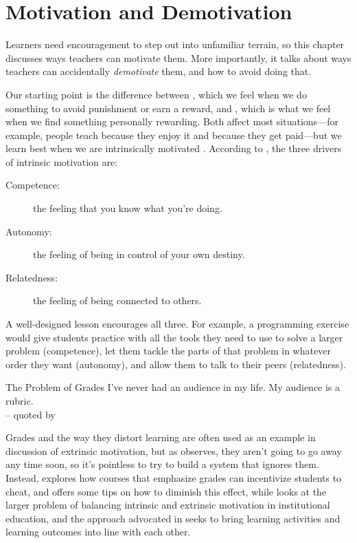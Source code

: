 \chapter{Motivation and Demotivation}\label{s:motivation}

Learners need encouragement to step out into unfamiliar terrain, so this
chapter discusses ways teachers can motivate them. More importantly, it
talks about ways teachers can accidentally \emph{demotivate} them, and how to
avoid doing that.

Our starting point is the difference between , which we feel when we do
something to avoid punishment or earn a reward, and , which is what we feel when we
find something personally rewarding. Both affect most situations---for
example, people teach because they enjoy it and because they get
paid---but we learn best when we are intrinsically motivated
\cite{Wlod2017}. According to , the three drivers of intrinsic
motivation are:

\begin{description}
\item[Competence:]
the feeling that you know what you're doing.
\item[Autonomy:]
the feeling of being in control of your own destiny.
\item[Relatedness:]
the feeling of being connected to others.
\end{description}

A well-designed lesson encourages all three. For example, a programming
exercise would give students practice with all the tools they need to
use to solve a larger problem (competence), let them tackle the parts of
that problem in whatever order they want (autonomy), and allow them to
talk to their peers (relatedness).

\begin{aside}{The Problem of Grades}
  I've never had an audience in my life. My audience is a rubric.\\
  -- quoted by 

  Grades and the way they distort learning are often used as an
  example in discussion of extrinsic motivation, but as
  \cite{Mill2016a} observes, they aren't going to go away any time
  soon, so it's pointless to try to build a system that ignores
  them. Instead, \cite{Lang2013} explores how courses that
  emphasize grades can incentivize students to cheat, and offers some
  tips on how to diminish this effect, while \cite{Covi2017} looks
  at the larger problem of balancing intrinsic and extrinsic
  motivation in institutional education, and the  approach advocated in
  \cite{Bigg2011} seeks to bring learning activities and learning
  outcomes into line with each other.
\end{aside}

